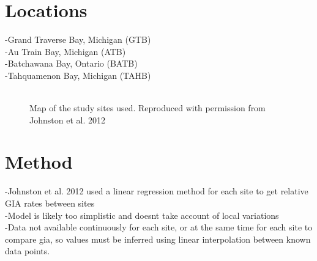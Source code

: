 \documentclass{article}
\begin{document}
\section{Locations}   
-Grand Traverse Bay, Michigan (GTB)\\
-Au Train Bay, Michigan (ATB)\\
-Batchawana Bay, Ontario (BATB)\\
-Tahquamenon Bay, Michigan (TAHB)\\
\\
\begin{figure}[h]
	\caption{Map of the study sites used. Reproduced with permission from Johnston et al. 2012}
	\label{fig:jj2012map}
\end{figure}

\newpage


\newpage

\newpage
\section[2]{Method}
-Johnston et al. 2012 used a linear regression method for each site to get relative GIA rates between sites\\
-Model is likely too simplistic and doesnt take account of local variations\\
-Data not available continuously for each site, or at the same time for each site to compare gia, so values must be inferred using linear interpolation between known data points.\\

\newpage
\end{document}
